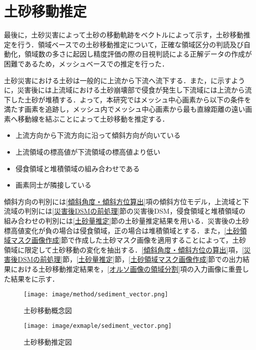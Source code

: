  \section{土砂移動推定}
    \label{土砂移動推定}
    最後に，土砂災害によって土砂の移動軌跡をベクトルによって示す，土砂移動推定を行う．領域ベースでの土砂移動推定について，正確な領域区分の判読及び自動化，領域数の多さに起因し精度評価の際の目視判読による正解データの作成が困難であるため，メッシュベースでの推定を行った．

    土砂災害における土砂は一般的に上流から下流へ流下する．また，に示すように，災害後には上流域における土砂崩壊部で侵食が発生し下流域には上流から流下した土砂が堆積する\cite{土砂量解析5}．よって，本研究ではメッシュ中心画素から以下の条件を満たす画素を追跡し，メッシュ内でメッシュ中心画素から最も直線距離の遠い画素へ移動線を結ぶことによって土砂移動を推定する．

    \begin{itemize}
      \setlength{\itemsep}{-5pt}
      \item 上流方向から下流方向に沿って傾斜方向が向いている
      \item 上流領域の標高値が下流領域の標高値より低い
      \item 侵食領域と堆積領域の組み合わせである
      \item 画素同士が隣接している
    \end{itemize}

    傾斜方向の判別には\ref{傾斜角度・傾斜方位算出}項の傾斜方位モデル，上流域と下流域の判別には\ref{災害後DSMの前処理}節の災害後DSM，侵食領域と堆積領域の組み合わせの判別には\ref{土砂量推定}節の土砂量推定結果を用いる．災害後の土砂標高値変化が負の場合は侵食領域，正の場合は堆積領域とする．また，\ref{土砂領域マスク画像作成}節で作成した土砂マスク画像を適用することによって，土砂領域に限定して土砂移動の変化を抽出する．\ref{傾斜角度・傾斜方位の算出}項，\ref{災害後DSMの前処理}節，\ref{土砂量推定}節，\ref{土砂領域マスク画像作成}節での出力結果における土砂移動推定結果を，\ref{オルソ画像の領域分割}項の入力画像に重畳した結果をに示す．
    
    \begin{figure}[t]
      \centering
      \texttt{[image: image/method/sediment\_vector.png]}
      \caption{土砂移動概念図}
      \label{土砂移動概念図}
    \end{figure}

    \begin{figure}[t]
      \centering
      \texttt{[image: image/exmaple/sediment\_vector.png]}
      \caption{土砂移動推定図}
      \label{土砂移動推定結果}
    \end{figure}
  
